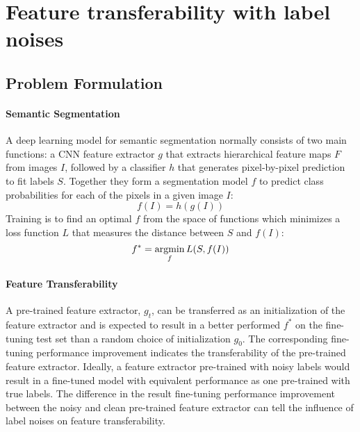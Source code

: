 \section{Feature transferability with label noises}
\label{sec:robustness}


\subsection{Problem Formulation}
\label{subsec:formulation}

\paragraph{Semantic Segmentation}

A deep learning model for semantic segmentation normally consists of two main functions: a CNN feature extractor $g$ that extracts hierarchical feature maps $F$ from images $I$, followed by a classifier $h$ that generates pixel-by-pixel prediction to fit labels $S$.
Together they form a segmentation model $f$ to predict class probabilities for each of the pixels in a given image $I$:
$$f(I) = h(g(I))$$
Training is to find an optimal $f$ from the space of functions which minimizes a loss function $L$ that measures the distance between $S$ and $f(I)$:
$$f^{\ast} = \operatorname*{argmin}_{f}{L(S, f(I))}$$

\paragraph{Feature Transferability}
A pre-trained feature extractor, $g_t$, can be transferred as an initialization of the feature extractor and is expected to result in a better performed $f^{\ast}$ on the fine-tuning test set than a random choice of initialization $g_0$.
The corresponding fine-tuning performance improvement indicates the transferability of the pre-trained feature extractor.
Ideally, a feature extractor pre-trained with noisy labels would result in a fine-tuned model with equivalent performance as one pre-trained with true labels.
The difference in the result fine-tuning performance improvement between the noisy and clean pre-trained feature extractor can tell the influence of label noises on feature transferability.


